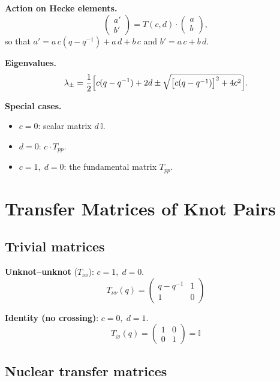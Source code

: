 \documentclass[12pt,a4paper]{article}
\newcommand{\II}{\mathbb{I}}
\begin{document}
\medskip

\noindent\textbf{Action on Hecke elements.}
\[
  \begin{pmatrix} a' \\ b' \end{pmatrix}
  = T(c,d) \cdot \begin{pmatrix} a \\ b \end{pmatrix},
\]
so that $a' = a\,c(q - q^{-1}) + a\,d + b\,c$ and $b' = a\,c + b\,d$.

\medskip

\noindent\textbf{Eigenvalues.}
\[
  \lambda_\pm
  = \frac{1}{2}\Bigl[c(q - q^{-1}) + 2d
    \pm \sqrt{\bigl[c(q - q^{-1})\bigr]^2 + 4c^2}\Bigr].
\]

\medskip

\noindent\textbf{Special cases.}
\begin{itemize}
  \item $c = 0$: scalar matrix $d\,\II$.
  \item $d = 0$: $c \cdot T_{pp}$.
  \item $c = 1,\; d = 0$: the fundamental matrix $T_{pp}$.
\end{itemize}

\section{Transfer Matrices of Knot Pairs}

\subsection{Trivial matrices}

\noindent\textbf{Unknot--unknot} ($T_{\nu\nu}$): $c = 1,\; d = 0$.
\[
  \boxed{T_{\nu\nu}(q)
  = \begin{pmatrix} q - q^{-1} & 1 \\ 1 & 0 \end{pmatrix}}
\]

\noindent\textbf{Identity (no crossing)}: $c = 0,\; d = 1$.
\[
  \boxed{T_\varnothing(q)
  = \begin{pmatrix} 1 & 0 \\ 0 & 1 \end{pmatrix} = \II}
\]

\subsection{Nuclear transfer matrices}
\end{document}
